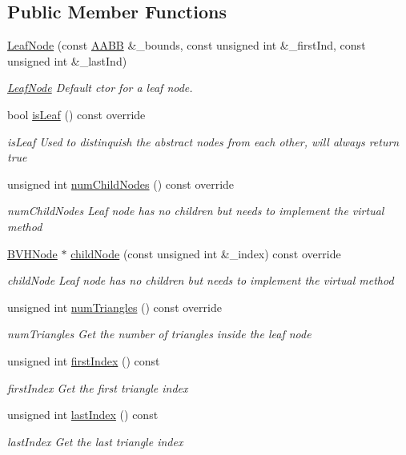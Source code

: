 \subsection*{Public Member Functions}
\begin{DoxyCompactItemize}
\item 
\hyperlink{classLeafNode_a5d896a0ea632f27c4c62700123a353c5}{Leaf\-Node} (const \hyperlink{classAABB}{A\-A\-B\-B} \&\-\_\-bounds, const unsigned int \&\-\_\-first\-Ind, const unsigned int \&\-\_\-last\-Ind)
\begin{DoxyCompactList}\small\item\em \hyperlink{classLeafNode}{Leaf\-Node} Default ctor for a leaf node. \end{DoxyCompactList}\item 
bool \hyperlink{classLeafNode_a4971bdbac579dd2d7688aa8706a41ea1}{is\-Leaf} () const override
\begin{DoxyCompactList}\small\item\em is\-Leaf Used to distinquish the abstract nodes from each other, will always return true \end{DoxyCompactList}\item 
unsigned int \hyperlink{classLeafNode_a897312601f3726f7d20b3d73959c111a}{num\-Child\-Nodes} () const override
\begin{DoxyCompactList}\small\item\em num\-Child\-Nodes Leaf node has no children but needs to implement the virtual method \end{DoxyCompactList}\item 
\hyperlink{classBVHNode}{B\-V\-H\-Node} $\ast$ \hyperlink{classLeafNode_a5c8eac5f86f69e5cae6f41d902550d39}{child\-Node} (const unsigned int \&\-\_\-index) const override
\begin{DoxyCompactList}\small\item\em child\-Node Leaf node has no children but needs to implement the virtual method \end{DoxyCompactList}\item 
unsigned int \hyperlink{classLeafNode_a8c138df453e78a56905e9066fb246f4f}{num\-Triangles} () const override
\begin{DoxyCompactList}\small\item\em num\-Triangles Get the number of triangles inside the leaf node \end{DoxyCompactList}\item 
unsigned int \hyperlink{classLeafNode_ad354a711fb811f508b682c37ecf2b471}{first\-Index} () const 
\begin{DoxyCompactList}\small\item\em first\-Index Get the first triangle index \end{DoxyCompactList}\item 
unsigned int \hyperlink{classLeafNode_af096e8e428d5f02d02ed16ee182b56d4}{last\-Index} () const 
\begin{DoxyCompactList}\small\item\em last\-Index Get the last triangle index \end{DoxyCompactList}\end{DoxyCompactItemize}
